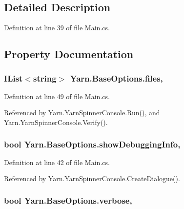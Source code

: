 \subsection{Detailed Description}


Definition at line 39 of file Main.\-cs.



\subsection{Property Documentation}
\hypertarget{a00042_aa93cbb1bc1d5328e0a417012621e92d2}{
\subsubsection[{files}]{\setlength{\rightskip}{0pt plus 5cm}I\-List$<$string$>$ Yarn.\-Base\-Options.\-files\hspace{0.3cm}{\ttfamily [get]}, {\ttfamily [set]}}}\label{a00042_aa93cbb1bc1d5328e0a417012621e92d2}


Definition at line 49 of file Main.\-cs.



Referenced by Yarn.\-Yarn\-Spinner\-Console.\-Run(), and Yarn.\-Yarn\-Spinner\-Console.\-Verify().

\hypertarget{a00042_a89964ea17bd19caf00cb5bff563ed01c}{
\subsubsection[{show\-Debugging\-Info}]{\setlength{\rightskip}{0pt plus 5cm}bool Yarn.\-Base\-Options.\-show\-Debugging\-Info\hspace{0.3cm}{\ttfamily [get]}, {\ttfamily [set]}}}\label{a00042_a89964ea17bd19caf00cb5bff563ed01c}


Definition at line 42 of file Main.\-cs.



Referenced by Yarn.\-Yarn\-Spinner\-Console.\-Create\-Dialogue().

\hypertarget{a00042_ada4d83d1756918f362d55f6649b82b17}{
\subsubsection[{verbose}]{\setlength{\rightskip}{0pt plus 5cm}bool Yarn.\-Base\-Options.\-verbose\hspace{0.3cm}{\ttfamily [get]}, {\ttfamily [set]}}}\label{a00042_ada4d83d1756918f362d55f6649b82b17}


